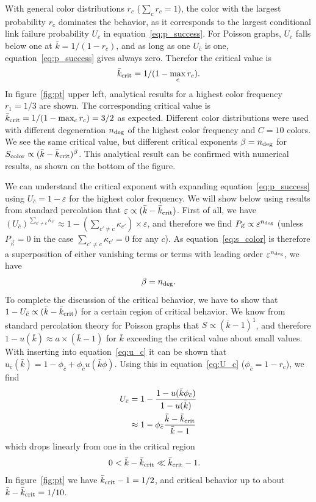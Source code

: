 \documentclass[aps, pre, onecolumn, a4paper, floatfix]{revtex4}
\begin{document}
With general color distributions $r_c$ ($\sum_c r_c =1$), the color with the largest probability 
$r_c$ dominates 
the behavior, as it corresponds to the largest conditional link failure probability $U_{\bar c}$
in equation~\ref{eq:p_success}. For Poisson graphs, $U_{\bar c}$ 
falls below one at ${\bar k}=1/(1-r_c)$, and as long as one $U_{\bar c}$ is one, equation~\ref{eq:p_success}
gives always zero. Therefor the critical value is 
\begin{align}
{\bar k}_{\rm crit}=1/(1-\max_c r_c).
\end{align}
In figure~\ref{fig:pt} upper left, analytical results for a highest color frequency $r_1=1/3$ are shown. 
The corresponding critical value is ${\bar k}_{\rm crit}=1/(1-\max_c r_c)=3/2$ as expected. 
Different color distributions were used with different degeneration $n_{\rm deg}$ of the highest color 
frequency and $C=10$ colors. We see the same critical value, but different critical exponents $\beta = n_{\rm deg}$ for 
$S_{\rm color} \propto ({\bar k}-{\bar k}_{\rm crit})^{\beta}$.
This analytical result can be confirmed with numerical results, as shown on the bottom of the figure. 


We can understand the critical exponent with expanding equation~\ref{eq:p_success} using 
$U_{\bar c}=1-\varepsilon$ for the highest color frequency. 
We will show below using results from standard percolation that 
$\varepsilon\propto ({\bar k}-{\bar k}_{\rm crit})$. First of all, we have 
$(U_{\bar c})^{\sum_{c'\neq c} \kappa_{c'} }\approx 1-({\sum_{c'\neq c} \kappa_{c'} })\times \varepsilon$, and therefore we find 
$P_{\vec \kappa} \propto \varepsilon^{n_{\rm deg}}$ (unless $P_{\vec \kappa} = 0$ in the case ${\sum_{c'\neq c} \kappa_{c'} }=0$
for any $c$). As equation~\ref{eq:s_color} is therefore a superposition of either vanishing terms or terms with 
leading order $\varepsilon^{n_{\rm deg}}$, we have 
\begin{align}
\beta=n_{\rm deg}.
\end{align}
To complete the discussion of the critical behavior, we have to show that 
$1- U_{\bar c}\propto ({\bar k}-{\bar k}_{\rm crit})$ for a certain region of critical behavior. 
We know from standard percolation theory for Poisson graphs that $S \propto ({\bar k}-1)^1$, and therefore 
$1-u({\bar k})\approx a \times ({\bar k}-1)$ for $\bar k$ exceeding the critical value 
about small values. With inserting into equation~\ref{eq:u_c} it can be shown that 
$u_{\bar c}({\bar k})=1-\phi_{\bar c}+\phi_{\bar c}u({\bar k}\phi)$. Using this in 
equation~\ref{eq:U_c} ($\phi_{\bar c}=1-r_c$), we find 
\begin{align}
U_{\bar c} &= 1 - \frac{1-u({\bar k}\phi_{\bar c})}{1-u({\bar k})}\\
&\approx 1- \phi_{\bar c} \frac{{\bar k}-{\bar k}_{\rm crit}}{{\bar k}-1}
\end{align}
which drops linearly from one in the critical region
\begin{align}
0< {\bar k}-{\bar k}_{\rm crit} &\ll {\bar k}_{\rm crit}-1.
\end{align}
In figure~\ref{fig:pt} we have ${\bar k}_{\rm crit}-1=1/2$, and critical behavior up to 
about ${\bar k}-{\bar k}_{\rm crit}=1/10$.
\end{document}

